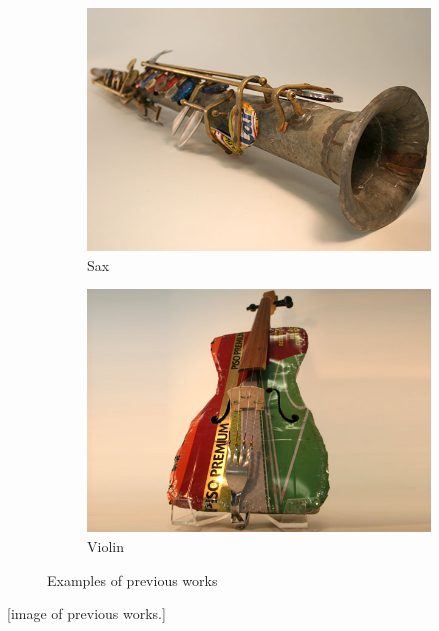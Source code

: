\begin{figure}
    \centering
    \begin{subfigure}[b]{0.47\textwidth}
        \includegraphics[width=\textwidth]{graphics/landfill_harmonic-sax.jpg}
        \caption{Sax}
        \label{fig:landfill_harmonic-sax}
    \end{subfigure}
    \begin{subfigure}[b]{0.47\textwidth}
        \includegraphics[width=\textwidth]{graphics/landfill_harmonic-violin.jpg}
        \caption{Violin}
        \label{fig:landfill_harmonic-violin}
    \end{subfigure}
    \caption{Examples of previous works}
    \label{fig:animals}
\end{figure}

[image of previous works.]

